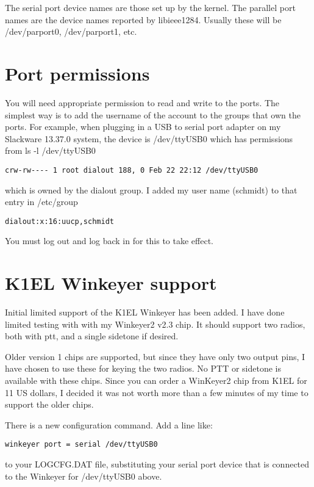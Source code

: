 \documentclass[12pt]{article}
\begin{document}
The serial port device names are those set up by the kernel.
The parallel port names are the device names reported by
libieee1284. Usually these will be /dev/parport0, /dev/parport1, etc.

\section{Port permissions}
You will need appropriate permission to read and write to the ports.
The simplest way is to add the username of the account to the groups
that own the ports. For example, when plugging in a USB to serial
port adapter on my Slackware 13.37.0 system, the device is /dev/ttyUSB0
which has permissions from ls -l /dev/ttyUSB0
\begin{verbatim}
crw-rw---- 1 root dialout 188, 0 Feb 22 22:12 /dev/ttyUSB0
\end{verbatim}
which is owned by the dialout group. I added my user name (schmidt) to
that entry in /etc/group
\begin{verbatim}
dialout:x:16:uucp,schmidt
\end{verbatim}
You must log out and log back in for this to take effect.

\section{K1EL Winkeyer support}
Initial limited support of the K1EL Winkeyer has been added.
I have done limited testing with
with my Winkeyer2 v2.3 chip. It should support two radios, both with
ptt, and a single sidetone if desired.

Older version 1 chips are supported, but since they have only two output
pins, I have chosen to use these for keying the two radios. No PTT or
sidetone is available with these chips. Since you can order a WinKeyer2
chip from K1EL for 11 US dollars, I decided it was not worth more than
a few minutes of my time to support the older chips.

There is a new configuration
command. Add a line like:
\begin{verbatim}
winkeyer port = serial /dev/ttyUSB0
\end{verbatim}
to your LOGCFG.DAT file, substituting your serial port device that
is connected to the Winkeyer for /dev/ttyUSB0 above.
\end{document}
